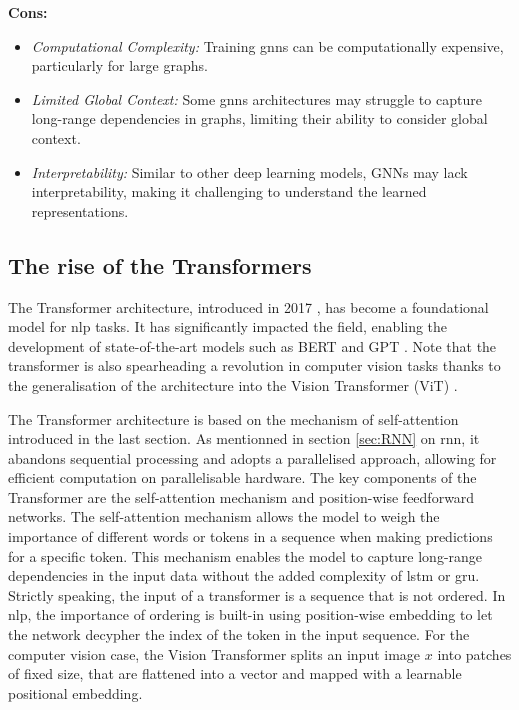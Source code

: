 \textbf{Cons:}
\begin{itemize}
    \item \textit{Computational Complexity:} Training \gls{gnn}s can be computationally expensive, particularly for large graphs.
    \item \textit{Limited Global Context:} Some \gls{gnn}s architectures may struggle to capture long-range dependencies in graphs, limiting their ability to consider global context.
    \item \textit{Interpretability:} Similar to other deep learning models, GNNs may lack interpretability, making it challenging to understand the learned representations.
\end{itemize}

\subsection{The rise of the Transformers}\label{sec:transformer}

The Transformer architecture, introduced in 2017 \cite{NIPS_transformerPaper}, has become a foundational model for \gls{nlp} tasks. It has significantly impacted the field, enabling the development of state-of-the-art models such as BERT \cite{devlin-etal-2019-bert} and GPT \cite{radford2018improving}. Note that the transformer is also spearheading a revolution in computer vision tasks thanks to the generalisation of the architecture into the Vision Transformer (ViT) \cite{vitPaper}.

The Transformer architecture is based on the mechanism of self-attention introduced in the last section. As mentionned in section \ref{sec:RNN} on \gls{rnn}, it abandons sequential processing and adopts a parallelised approach, allowing for efficient computation on parallelisable hardware. The key components of the Transformer are the self-attention mechanism and position-wise feedforward networks. The self-attention mechanism allows the model to weigh the importance of different words or tokens in a sequence when making predictions for a specific token. This mechanism enables the model to capture long-range dependencies in the input data without the added complexity of \gls{lstm} or \gls{gru}. Strictly speaking, the input of a transformer is a sequence that is not ordered. In \gls{nlp}, the importance of ordering is built-in using position-wise embedding to let the network decypher the index of the token in the input sequence. For the computer vision case, the Vision Transformer splits an input image $x$ into patches of fixed size, that are flattened into a vector and mapped with a learnable positional embedding.

